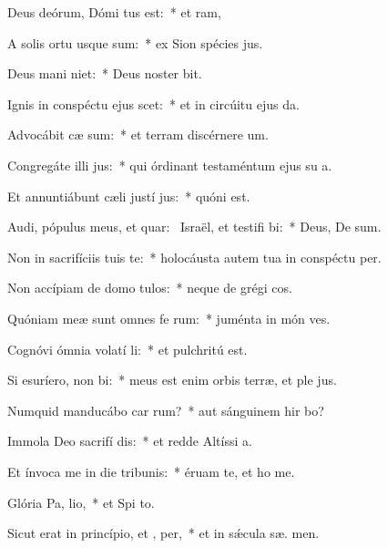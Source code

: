 \item Deus deórum, Dómi tus est:~* et  ram,
\item A solis ortu usque  sum:~* ex Sion spécies  jus.
\item Deus mani niet:~* Deus noster   bit.
\item Ignis in conspéctu ejus scet:~* et in circúitu ejus  da.
\item Advocábit cæ sum:~* et terram discérnere  um.
\item Congregáte illi  jus:~* qui órdinant testaméntum ejus su a.
\item Et annuntiábunt cæli justí jus:~* quóni   est.
\item Audi, pópulus meus, et quar:~\pscross{} Israël, et testifi bi:~* Deus, De   sum.
\item Non in sacrifíciis tuis  te:~* holocáusta autem tua in conspéctu   per.
\item Non accípiam de domo  tulos:~* neque de grégi  cos.
\item Quóniam meæ sunt omnes fe rum:~* juménta in món  ves.
\item Cognóvi ómnia volatí li:~* et pulchritú   est.
\item Si esuríero, non  bi:~* meus est enim orbis terræ, et ple jus.
\item Numquid manducábo car rum?~* aut sánguinem hir bo?
\item Immola Deo sacrifí dis:~* et redde Altíssi  a.
\item Et ínvoca me in die tribunis:~* éruam te, et ho me.
\item Glória Pa,  lio,~* et Spi to.
\item Sicut erat in princípio, et ,  per,~* et in sǽcula sæ. men.

